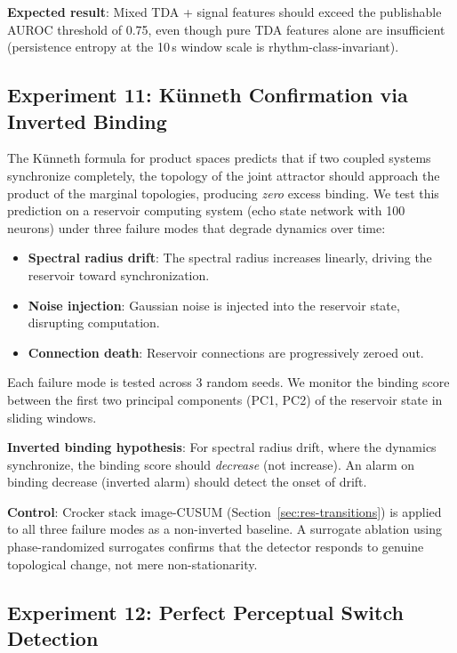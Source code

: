\documentclass[11pt,a4paper]{article}
\begin{document}
\textbf{Expected result}: Mixed TDA + signal features should exceed the publishable AUROC threshold of 0.75, even though pure TDA features alone are insufficient (persistence entropy at the 10\,s window scale is rhythm-class-invariant).

\subsection{Experiment 11: K\"unneth Confirmation via Inverted Binding}\label{sec:exp-kunneth}

The K\"unneth formula for product spaces predicts that if two coupled systems synchronize completely, the topology of the joint attractor should approach the product of the marginal topologies, producing \emph{zero} excess binding.
We test this prediction on a reservoir computing system (echo state network with 100 neurons) under three failure modes that degrade dynamics over time:
\begin{itemize}
    \item \textbf{Spectral radius drift}: The spectral radius increases linearly, driving the reservoir toward synchronization.
    \item \textbf{Noise injection}: Gaussian noise is injected into the reservoir state, disrupting computation.
    \item \textbf{Connection death}: Reservoir connections are progressively zeroed out.
\end{itemize}
Each failure mode is tested across 3 random seeds.
We monitor the binding score between the first two principal components (PC1, PC2) of the reservoir state in sliding windows.

\textbf{Inverted binding hypothesis}: For spectral radius drift, where the dynamics synchronize, the binding score should \emph{decrease} (not increase).
An alarm on binding decrease (inverted alarm) should detect the onset of drift.

\textbf{Control}: Crocker stack image-CUSUM (Section~\ref{sec:res-transitions}) is applied to all three failure modes as a non-inverted baseline.
A surrogate ablation using phase-randomized surrogates confirms that the detector responds to genuine topological change, not mere non-stationarity.

\subsection{Experiment 12: Perfect Perceptual Switch Detection}\label{sec:exp-rivalry-perfect}
\end{document}
